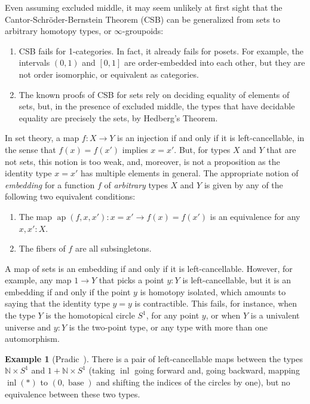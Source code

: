 \documentclass{article}
\theoremstyle{definition}
\newtheorem{example}[theorem]{Example}
\begin{document}
Even assuming excluded middle, it may seem unlikely at first sight
that the Cantor-Schr\"oder-Bernstein Theorem (CSB) can be generalized from sets
to arbitrary homotopy types, or $\infty$-groupoids:
\begin{enumerate}
 	\item CSB fails for 1-categories.
In fact, it already fails for posets. For example, the intervals $(0,1)$ and $[0,1]$ are order-embedded into each other, but they are not order isomorphic, or equivalent as categories.
 	\item The known proofs of CSB for sets rely on deciding equality of elements of sets, but, in the presence of excluded middle, the types that have decidable equality are precisely the sets, by Hedberg's Theorem.
\end{enumerate}
In set theory, a map $f : X \to Y$ is an injection if and only if it is left-cancellable, in the sense that $f(x)=f(x')$ implies $x=x'$. But, for types $X$ and $Y$ that are not sets, this notion is too weak, and, moreover, is not a proposition as the identity type $x = x'$ has multiple elements in general. The appropriate notion of \emph{embedding} for a function $f$ of \emph{arbitrary} types $X$ and $Y$ is given by any of the following two equivalent conditions:
\begin{enumerate}
 	\item The map $\operatorname{ap}(f,x,x') : x = x' \to f(x) = f(x')$ is an equivalence for any $x,x':X$.
 	\item The fibers of $f$ are all subsingletons.
\end{enumerate}

A map of sets is an embedding if and only if it is left-cancellable. However, for example, any map $1 \to Y$ that picks a point $y:Y$ is left-cancellable, but it is an embedding if and only if the point $y$ is homotopy isolated, which amounts to saying that the identity type $y = y$ is contractible. This fails, for instance, when the type $Y$ is the homotopical circle $S^1$, for any point $y$, or when $Y$ is a univalent universe and $y:Y$ is the two-point type, or any type with more than one automorphism.

\begin{example}[Pradic~\cite{pradic:example}]
  There is a pair of left-cancellable maps between the types
  $\mathbb{N} \times S^1$ and $1 + \mathbb{N} \times S^1$ (taking
  $\operatorname{inl}$ going forward and, going backward, mapping
  $\operatorname{inl}(*)$ to $(0, \operatorname{base})$ and shifting
  the indices of the circles by one), but no equivalence between these
  two types.
\end{example}
\end{document}

